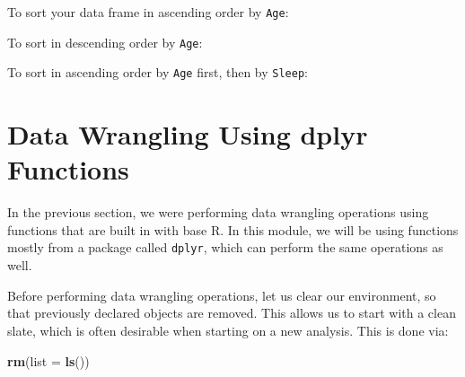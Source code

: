 \documentclass[
]{book}
\newenvironment{Shaded}{\begin{snugshade}}{\end{snugshade}}
\newcommand{\AttributeTok}[1]{\textcolor[rgb]{0.13,0.29,0.53}{#1}}
\newcommand{\FunctionTok}[1]{\textcolor[rgb]{0.13,0.29,0.53}{\textbf{#1}}}
\newcommand{\NormalTok}[1]{#1}
\newcommand{\OtherTok}[1]{\textcolor[rgb]{0.56,0.35,0.01}{#1}}
\newcommand{\SpecialCharTok}[1]{\textcolor[rgb]{0.81,0.36,0.00}{\textbf{#1}}}
\begin{document}
To sort your data frame in ascending order by \texttt{Age}:

\begin{Shaded}
\end{Shaded}

To sort in descending order by \texttt{Age}:

\begin{Shaded}
\end{Shaded}

To sort in ascending order by \texttt{Age} first, then by \texttt{Sleep}:

\begin{Shaded}
\end{Shaded}

\hypertarget{data-wrangling-using-dplyr-functions}{%
\section{Data Wrangling Using dplyr Functions}\label{data-wrangling-using-dplyr-functions}}

In the previous section, we were performing data wrangling operations using functions that are built in with base R. In this module, we will be using functions mostly from a package called \texttt{dplyr}, which can perform the same operations as well.

Before performing data wrangling operations, let us clear our environment, so that previously declared objects are removed. This allows us to start with a clean slate, which is often desirable when starting on a new analysis. This is done via:

\begin{Shaded}
\begin{Highlighting}[]
\FunctionTok{rm}\NormalTok{(}\AttributeTok{list =} \FunctionTok{ls}\NormalTok{())}
\end{Highlighting}
\end{Shaded}
\end{document}
